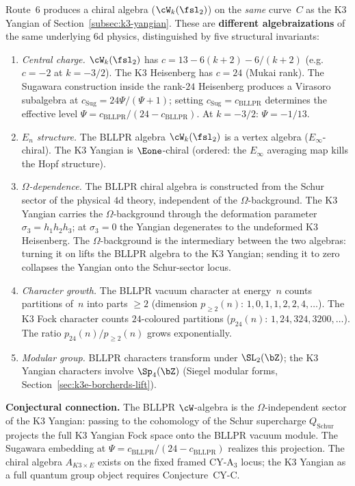\begin{remark}
\label{rem:bllpr-k3-connection}
Route~6 produces a chiral algebra ($\cW_k(\fsl_2)$) on the \emph{same} curve~$C$ as the K3 Yangian of Section~\ref{subsec:k3-yangian}. These are \textbf{different algebraizations} of the same underlying $6$d physics, distinguished by five structural invariants:
\begin{enumerate}[label=\textup{(\roman*)}]
 \item \emph{Central charge.} $\cW_k(\fsl_2)$ has $c = 13 - 6(k+2) - 6/(k+2)$ (e.g.\ $c = -2$ at $k = -3/2$). The K3 Heisenberg has $c = 24$ (Mukai rank). The Sugawara construction inside the rank-$24$ Heisenberg produces a Virasoro subalgebra at $c_{\mathrm{Sug}} = 24\Psi/(\Psi + 1)$; setting $c_{\mathrm{Sug}} = c_{\mathrm{BLLPR}}$ determines the effective level $\Psi = c_{\mathrm{BLLPR}}/(24 - c_{\mathrm{BLLPR}})$. At $k = -3/2$: $\Psi = -1/13$.

 \item \emph{$E_n$ structure.} The BLLPR algebra $\cW_k(\fsl_2)$ is a vertex algebra ($E_\infty$-chiral). The K3 Yangian is $\Eone$-chiral (ordered: the $E_\infty$ averaging map kills the Hopf structure).

 \item \emph{$\Omega$-dependence.} The BLLPR chiral algebra is
 constructed from the Schur sector of the physical $4$d theory,
 independent of the $\Omega$-background. The K3 Yangian carries the
 $\Omega$-background through the deformation parameter
 $\sigma_3 = h_1 h_2 h_3$; at $\sigma_3 = 0$ the Yangian degenerates
 to the undeformed K3 Heisenberg. The $\Omega$-background is the
 intermediary between the two algebras: turning it on lifts the BLLPR
 algebra to the K3 Yangian; sending it to zero collapses the Yangian
 onto the Schur-sector locus.

 \item \emph{Character growth.} The BLLPR vacuum character at energy~$n$ counts partitions of~$n$ into parts $\geq 2$ (dimension $p_{\geq 2}(n)$: $1, 0, 1, 1, 2, 2, 4, \ldots$). The K3 Fock character counts $24$-coloured partitions ($p_{24}(n)$: $1, 24, 324, 3200, \ldots$). The ratio $p_{24}(n)/p_{\geq 2}(n)$ grows exponentially.

 \item \emph{Modular group.} BLLPR characters transform under $\SL_2(\bZ)$; the K3 Yangian characters involve $\Sp_4(\bZ)$ (Siegel modular forms, Section~\ref{sec:k3e-borcherds-lift}).
\end{enumerate}

\noindent\textbf{Conjectural connection.} The BLLPR $\cW$-algebra is the $\Omega$-independent sector of the K3 Yangian: passing to the cohomology of the Schur supercharge $Q_{\mathrm{Schur}}$ projects the full K3 Yangian Fock space onto the BLLPR vacuum module. The Sugawara embedding at $\Psi = c_{\mathrm{BLLPR}}/(24 - c_{\mathrm{BLLPR}})$ realizes this projection. The chiral algebra \(A_{K3\times E}\) exists on the fixed framed CY-A$_3$ locus; the K3 Yangian as a full quantum group object requires Conjecture~CY-C.
\end{remark}


